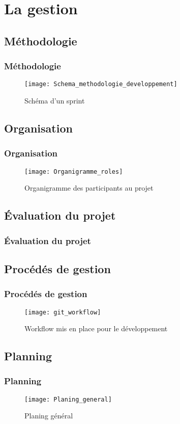 \section{La gestion}
\subsection{Méthodologie}
\begin{frame}
  \frametitle{\color{white} Méthodologie}
  \begin{figure}[p]
    \centering
    \texttt{[image: Schema\_methodologie\_developpement]}
    \caption{Schéma d'un sprint}
  \end{figure}
\end{frame}
\subsection{Organisation}
\begin{frame}
  \frametitle{\color{white} Organisation}
  \begin{figure}[p]
    \centering
    \texttt{[image: Organigramme\_roles]}
    \caption{Organigramme des participants au projet}
  \end{figure}
\end{frame}
\subsection{Évaluation du projet}
\begin{frame}
  \frametitle{\color{white} Évaluation du projet}
 
\end{frame}
\subsection{Procédés de gestion}
\begin{frame}
  \frametitle{\color{white} Procédés de gestion}
  \begin{figure}[p]
    \centering
    \texttt{[image: git\_workflow]}
    \caption{Workflow mis en place pour le développement}
  \end{figure}
\end{frame}
\subsection{Planning}
\begin{frame}
  \frametitle{\color{white} Planning}
  \begin{figure}[p]
    \centering
    \texttt{[image: Planing\_general]}
    \caption{Planing général}
  \end{figure}
\end{frame}